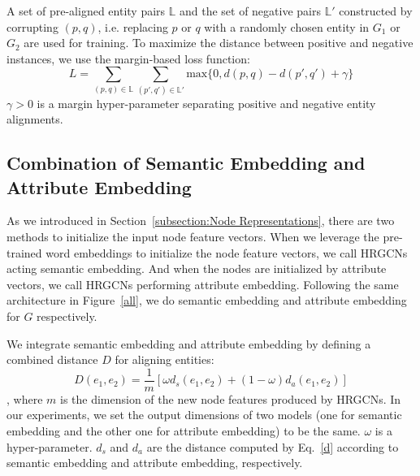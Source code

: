 	A set of pre-aligned entity pairs $\mathbb{L}$ and the set of negative pairs $\mathbb{L'}$  constructed by corrupting $(p, q)$, i.e. replacing $p$ or $q$ with a randomly chosen entity in $G_1$ or $G_2$ are used for training. To maximize the distance between positive and negative instances, we use the margin-based loss function:
	\begin{equation}
	\label{d}
	L=\sum\limits_{(p,q)\in \mathbb{L}}\sum\limits_{(p',q')\in \mathbb{L'}}\mathrm{max}\{0,d(p,q)-d(p',q')+\gamma\}
	\end{equation}
	$\gamma > 0$ is a margin hyper-parameter separating positive and negative entity alignments.
	
	\subsection{Combination of Semantic Embedding and Attribute Embedding}
	As we introduced in Section~\ref{subsection:Node Representations}, there are two methods to initialize the input node feature vectors. 
	When we leverage the pre-trained word embeddings to initialize the node feature vectors, we call HRGCNs acting semantic embedding. 
	And when the nodes are initialized by attribute vectors, we call HRGCNs performing attribute embedding. 
	Following the same architecture in Figure~\ref{all}, we do semantic embedding and attribute embedding for $G$ respectively.
	
	We integrate semantic embedding and attribute embedding by defining a combined distance $D$ for aligning entities:
	\begin{equation}
		D(e_1,e_2)=\frac{1}{m}[\omega d_s(e_1,e_2)+(1-\omega)d_a(e_1,e_2)]
	\end{equation}
	, where $m$ is the dimension of the new node features produced by HRGCNs. 
	In our experiments, we set the output dimensions of two models (one for semantic embedding and the other one for attribute embedding) to be the same. 
	$\omega$ is a hyper-parameter. $d_s$ and $d_a$ are the distance computed by Eq.~\ref{d} according to semantic embedding and attribute embedding, respectively.
	
